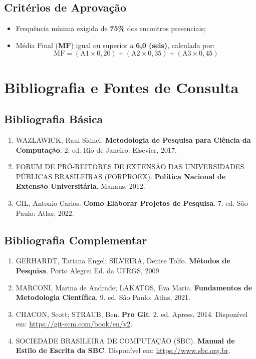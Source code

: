 \documentclass[12pt,a4paper]{article}
\begin{document}
\subsection{Critérios de Aprovação}
\begin{itemize}[leftmargin=*]
    \item Frequência mínima exigida de \textbf{75\%} dos encontros presenciais;
    \item Média Final (\textbf{MF}) igual ou superior a \textbf{6,0 (seis)}, calculada por:
    \[
    \text{MF} = (\text{A1} \times 0{,}20) + (\text{A2} \times 0{,}35) + (\text{A3} \times 0{,}45)
    \]
\end{itemize}

\section{Bibliografia e Fontes de Consulta}

\subsection{Bibliografia Básica}
\begin{enumerate}[leftmargin=*]
    \item WAZLAWICK, Raul Sidnei. \textbf{Metodologia de Pesquisa para Ciência da Computação}. 2. ed. Rio de Janeiro: Elsevier, 2017.
    \item FORUM DE PRÓ-REITORES DE EXTENSÃO DAS UNIVERSIDADES PÚBLICAS BRASILEIRAS (FORPROEX). \textbf{Política Nacional de Extensão Universitária}. Manaus, 2012.
    \item GIL, Antonio Carlos. \textbf{Como Elaborar Projetos de Pesquisa}. 7. ed. São Paulo: Atlas, 2022.
\end{enumerate}

\subsection{Bibliografia Complementar}
\begin{enumerate}[leftmargin=*]
    \item GERHARDT, Tatiana Engel; SILVEIRA, Denise Tolfo. \textbf{Métodos de Pesquisa}. Porto Alegre: Ed. da UFRGS, 2009.
    \item MARCONI, Marina de Andrade; LAKATOS, Eva Maria. \textbf{Fundamentos de Metodologia Científica}. 9. ed. São Paulo: Atlas, 2021.
    \item CHACON, Scott; STRAUB, Ben. \textbf{Pro Git}. 2. ed. Apress, 2014. Disponível em: \url{https://git-scm.com/book/en/v2}.
    \item SOCIEDADE BRASILEIRA DE COMPUTAÇÃO (SBC). \textbf{Manual de Estilo de Escrita da SBC}. Disponível em: \url{https://www.sbc.org.br}.
\end{enumerate}
\end{document}
